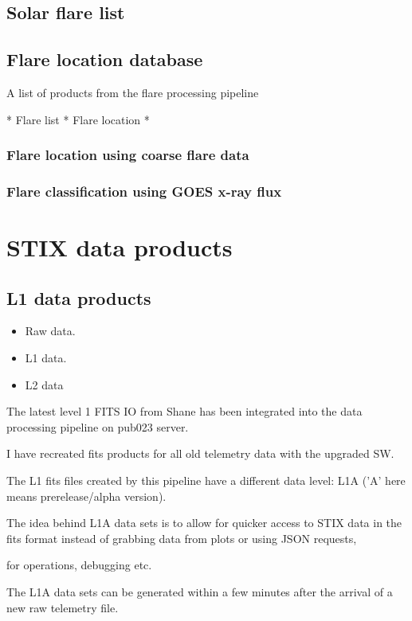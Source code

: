 \documentclass{aa}
\begin{document}
\subsection{Solar flare list}
\subsection{Flare location database}


A list of products from the flare processing pipeline

* Flare list
* Flare location
*

\subsubsection{Flare location using coarse flare data}
\subsubsection{Flare classification using GOES x-ray flux}

\section{STIX data products}

\subsection{L1 data products}
\begin{itemize}
    \item Raw data.
    \item L1 data.
    \item L2 data
    
\end{itemize}

The latest level 1 FITS IO from Shane has been integrated into the data processing pipeline on pub023 server.

I have recreated fits products for all old telemetry data with the upgraded SW.

The L1 fits files  created by this pipeline have a different data level:  L1A ('A' here means  prerelease/alpha version).

The idea behind L1A data sets is to allow for quicker access to STIX data in the fits format instead of grabbing  data from plots or using JSON requests,

for operations,  debugging  etc.

The L1A data sets can be generated within a few minutes after the arrival of a new raw telemetry file.
\end{document}
